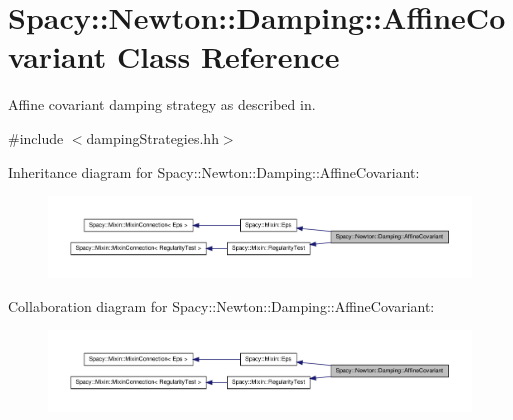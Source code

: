 \hypertarget{classSpacy_1_1Newton_1_1Damping_1_1AffineCovariant}{\section{\-Spacy\-:\-:\-Newton\-:\-:\-Damping\-:\-:\-Affine\-Covariant \-Class \-Reference}
\label{classSpacy_1_1Newton_1_1Damping_1_1AffineCovariant}
}


\-Affine covariant damping strategy as described in.  




{\ttfamily \#include $<$damping\-Strategies.\-hh$>$}



\-Inheritance diagram for \-Spacy\-:\-:\-Newton\-:\-:\-Damping\-:\-:\-Affine\-Covariant\-:
\nopagebreak
\begin{figure}[H]
\begin{center}
\leavevmode
\includegraphics[width=350pt]{classSpacy_1_1Newton_1_1Damping_1_1AffineCovariant__inherit__graph}
\end{center}
\end{figure}


\-Collaboration diagram for \-Spacy\-:\-:\-Newton\-:\-:\-Damping\-:\-:\-Affine\-Covariant\-:
\nopagebreak
\begin{figure}[H]
\begin{center}
\leavevmode
\includegraphics[width=350pt]{classSpacy_1_1Newton_1_1Damping_1_1AffineCovariant__coll__graph}
\end{center}
\end{figure}

